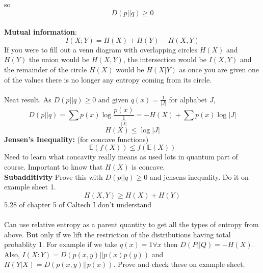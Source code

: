 \documentclass{article}
\begin{document}
so
$$
D(p||q) \geq 0
$$
\\ \textbf{Mutual information}:
\begin{equation}
    I(X;Y) = H(X) + H(Y) - H(X,Y)
\end{equation}
If you were to fill out a venn diagram with overlapping circles $H(X)$ and $H(Y)$ the union would be $H(X,Y)$, the intersection would be $I(X,Y)$ and the remainder of the circle $H(X)$ would be $H(X|Y)$ as once you are given one of the values there is no longer any entropy coming from its circle.\\\\
Neat result. As $D(p||q) \geq 0$ and given $q(x) = \frac{1}{|J|}$ for alphabet $J$,
$$
D(p||q) = \sum p(x) \log \frac{p(x)}{\frac{1}{|J|}} = - H(X) + \sum p(x) \log |J|
$$
$$
H(X) \leq \log |J|
$$
\textbf{Jensen's Inequality:} (for concave functions)
\begin{equation}
    \mathbb{E}(f(X)) \leq f(\mathbb{E}(X))
\end{equation}
Need to learn what concavity really means as used lots in quantum part of course. Important to know that $H(X)$ is concave.\\
\textbf{Subadditivity}
Prove this with $D(p||q) \geq 0$ and jensens inequality. Do it on example sheet 1.
\begin{equation}
    H(X,Y) \geq H(X) + H(Y)
\end{equation}
5.28 of chapter 5 of Caltech I don't understand\\\\
Can use relative entropy as a parent quantity to get all the types of entropy from above. But only if we lift the restriction of the distributions having total probablity 1. For example if we take $q(x) = 1 \forall x$ then $D(P||Q) = - H(X)$. Also, $I(X:Y) = D(p(x,y)||p(x)p(y))$ and $H(Y|X) = D(p(x,y)||p(x))$. Prove and check these on example sheet.
\end{document}

